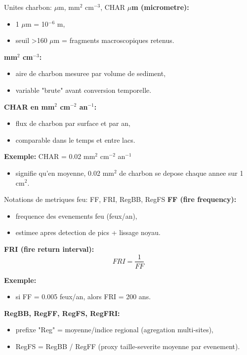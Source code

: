 \documentclass[aspectratio=169,11pt]{beamer}
\begin{document}
\begin{frame}{Unites charbon: \(\mu\)m, mm\(^2\) cm\(^{-3}\), CHAR}
\textbf{\(\mu\)m (micrometre):}
\begin{itemize}
  \item 1 \(\mu\)m = 10\(^{-6}\) m,
  \item seuil >160 \(\mu\)m = fragments macroscopiques retenus.
\end{itemize}

\textbf{mm\(^2\) cm\(^{-3}\):}
\begin{itemize}
  \item aire de charbon mesuree par volume de sediment,
  \item variable "brute" avant conversion temporelle.
\end{itemize}

\textbf{CHAR en mm\(^2\) cm\(^{-2}\) an\(^{-1}\):}
\begin{itemize}
  \item flux de charbon par surface et par an,
  \item comparable dans le temps et entre lacs.
\end{itemize}

\textbf{Exemple:} CHAR = 0.02 mm\(^2\) cm\(^{-2}\) an\(^{-1}\)
\begin{itemize}
  \item signifie qu'en moyenne, 0.02 mm\(^2\) de charbon se depose chaque annee sur 1 cm\(^2\).
\end{itemize}
\end{frame}

\begin{frame}{Notations de metriques feu: FF, FRI, RegBB, RegFS}
\textbf{FF (fire frequency):}
\begin{itemize}
  \item frequence des evenements feu (feux/an),
  \item estimee apres detection de pics + lissage noyau.
\end{itemize}

\textbf{FRI (fire return interval):}
\[
FRI = \frac{1}{FF}
\]

\textbf{Exemple:}
\begin{itemize}
  \item si FF = 0.005 feux/an, alors FRI = 200 ans.
\end{itemize}

\textbf{RegBB, RegFF, RegFS, RegFRI:}
\begin{itemize}
  \item prefixe "Reg" = moyenne/indice regional (agregation multi-sites),
  \item RegFS = RegBB / RegFF (proxy taille-severite moyenne par evenement).
\end{itemize}
\end{frame}
\end{document}
